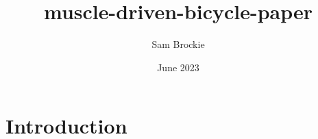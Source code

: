 \documentclass{article}
\title{muscle-driven-bicycle-paper}
\author{Sam Brockie}
\date{June 2023}
\begin{document}
\maketitle

\section{Introduction}
\end{document}
